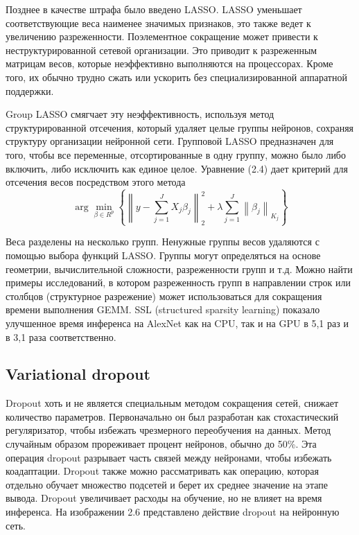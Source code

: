 \documentclass[oneside,final,12pt]{extreport}
\begin{document}
Позднее в качестве штрафа было введено LASSO. LASSO уменьшает соответствующие веса наименее значимых признаков, это также ведет к увеличению разреженности. Поэлементное сокращение может привести к неструктурированной сетевой организации. Это приводит к разреженным матрицам весов, которые неэффективно выполняются на процессорах. Кроме того, их обычно трудно сжать или ускорить без специализированной аппаратной поддержки. 

Group LASSO смягчает эту неэффективность, используя метод структурированной отсечения, который удаляет целые группы нейронов, сохраняя структуру организации нейронной сети. Групповой LASSO предназначен для того, чтобы все переменные, отсортированные в одну группу, можно было либо включить, либо исключить как единое целое. Уравнение (2.4) дает критерий для отсечения весов посредством этого метода
\begin{equation}
    \arg \min_{\beta\in R^p}\left \{ \left \| y - \sum_{j=1}^{J}X_j\beta_j \right \|^{2}_2 + \lambda \sum_{j=1}^{J}\left \| \beta_j \right \|_{K_j} \right \}
\end{equation}

Веса разделены на несколько групп. Ненужные группы весов удаляются с помощью выбора функций LASSO. Группы могут определяться на основе геометрии, вычислительной сложности, разреженности групп и т.д. Можно найти примеры исследований, в котором разреженность групп в направлении строк или столбцов (структурное разрежение) может использоваться для сокращения времени выполнения GEMM. SSL (structured sparsity learning) показало улучшенное время инференса на AlexNet как на CPU, так и на GPU в 5,1 раз и в 3,1 раза соответственно.

\subsection{Variational dropout}
Dropout хоть и не является специальным методом сокращения сетей, снижает количество параметров. Первоначально он был разработан как стохастический регуляризатор, чтобы избежать чрезмерного переобучения на данных. Метод случайным образом прореживает процент нейронов, обычно до 50\%. Эта операция dropout разрывает часть связей между нейронами, чтобы избежать коадаптации. Dropout также можно рассматривать как операцию, которая отдельно обучает множество подсетей и берет их среднее значение на этапе вывода. Dropout увеличивает расходы на обучение, но не влияет на время инференса. На изображении 2.6 представлено действие dropout на нейронную сеть.
\end{document}
